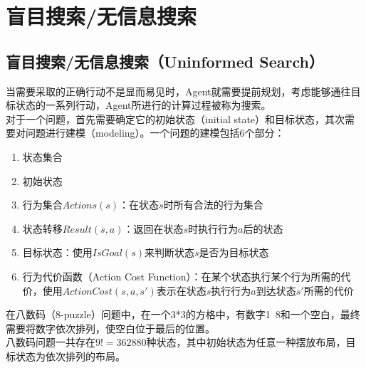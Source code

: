 \section{盲目搜索/无信息搜索}

\subsection{盲目搜索/无信息搜索（Uninformed Search）}

当需要采取的正确行动不是显而易见时，Agent就需要提前规划，考虑能够通往目标状态的一系列行动，Agent所进行的计算过程被称为搜索。\\

对于一个问题，首先需要确定它的初始状态（initial state）和目标状态，其次需要对问题进行建模（modeling）。一个问题的建模包括6个部分：

\begin{enumerate}
    \item 状态集合
    \item 初始状态
    \item 行为集合$ Actions(s) $：在状态$ s $时所有合法的行为集合
    \item 状态转移$ Result(s, a) $：返回在状态$ s $时执行行为$ a $后的状态
    \item 目标状态：使用$ IsGoal(s) $来判断状态$ s $是否为目标状态
    \item 行为代价函数（Action Cost Function）：在某个状态执行某个行为所需的代价，使用$ ActionCost(s, a, s') $表示在状态$ s $执行行为$ a $到达状态$ s' $所需的代价
\end{enumerate}

在八数码（8-puzzle）问题中，在一个3*3的方格中，有数字1~8和一个空白，最终需要将数字依次排列，使空白位于最后的位置。\\

八数码问题一共存在$ 9! = 362880 $种状态，其中初始状态为任意一种摆放布局，目标状态为依次排列的布局。\\

